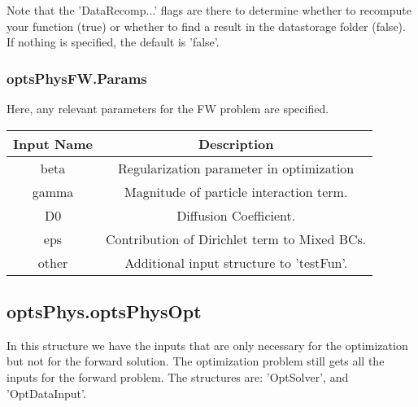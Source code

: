 \documentclass[11pt, a4paper]{article}
\theoremstyle{definition}
\begin{document}
	Note that the 'DataRecomp...' flags are there to determine whether to recompute your function (true) or whether to find a result in the datastorage folder (false). If nothing is specified, the default is 'false'.
\subsubsection{optsPhysFW.Params}
Here, any relevant parameters for the FW problem are specified. 

	\begin{center}
		\begin{tabular}{ |c| c | }
			\hline
			Input Name & Description \\ 
			\hline
			beta & Regularization parameter in optimization \\
			gamma & Magnitude of particle interaction term. \\ 
			D0 & Diffusion Coefficient.\\
		    eps & Contribution of Dirichlet term to Mixed BCs. \\
			other & Additional input structure to 'testFun'. \\
			\hline
		\end{tabular}
	\end{center}
\subsection{optsPhys.optsPhysOpt}
In this structure we have the inputs that are only necessary for the optimization but not for the forward solution. The optimization problem still gets all the inputs for the forward problem.
The structures are: 'OptSolver', and 'OptDataInput'.
\end{document}
